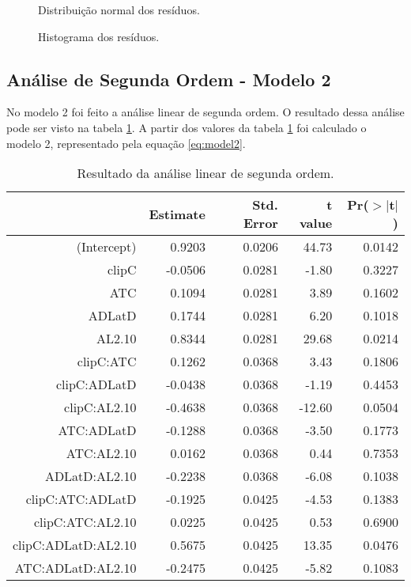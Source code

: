 \begin{figure}
    \centering
    \caption{Distribuição normal dos resíduos.}
    
    \label{fig:qq}
\end{figure}

\begin{figure}
    \centering
    \caption{Histograma dos resíduos.}
    
    \label{fig:hist}
\end{figure}

\subsection{Análise de Segunda Ordem - Modelo 2}

No modelo 2 foi feito a análise linear de segunda ordem. O resultado dessa análise pode ser visto na tabela \ref{tab:model2}. A partir dos valores da tabela \ref{tab:model2} foi calculado o modelo 2, representado pela equação \ref{eq:model2}.


\begin{table}[ht]
    \centering
    \caption{Resultado da análise linear de segunda ordem.}
    \begin{tabular}{rrrrr}
      \hline
     & Estimate & Std. Error & t value & Pr($>$$|$t$|$) \\ 
      \hline
    (Intercept) & 0.9203 & 0.0206 & 44.73 & 0.0142 \\ 
      clipC & -0.0506 & 0.0281 & -1.80 & 0.3227 \\ 
      ATC & 0.1094 & 0.0281 & 3.89 & 0.1602 \\ 
      ADLatD & 0.1744 & 0.0281 & 6.20 & 0.1018 \\ 
      AL2.10 & 0.8344 & 0.0281 & 29.68 & 0.0214 \\ 
      clipC:ATC & 0.1262 & 0.0368 & 3.43 & 0.1806 \\ 
      clipC:ADLatD & -0.0438 & 0.0368 & -1.19 & 0.4453 \\ 
      clipC:AL2.10 & -0.4638 & 0.0368 & -12.60 & 0.0504 \\ 
      ATC:ADLatD & -0.1288 & 0.0368 & -3.50 & 0.1773 \\ 
      ATC:AL2.10 & 0.0162 & 0.0368 & 0.44 & 0.7353 \\ 
      ADLatD:AL2.10 & -0.2238 & 0.0368 & -6.08 & 0.1038 \\ 
      clipC:ATC:ADLatD & -0.1925 & 0.0425 & -4.53 & 0.1383 \\ 
      clipC:ATC:AL2.10 & 0.0225 & 0.0425 & 0.53 & 0.6900 \\ 
      clipC:ADLatD:AL2.10 & 0.5675 & 0.0425 & 13.35 & 0.0476 \\ 
      ATC:ADLatD:AL2.10 & -0.2475 & 0.0425 & -5.82 & 0.1083 \\ 
       \hline
    \end{tabular}
    \label{tab:model2}
\end{table}

